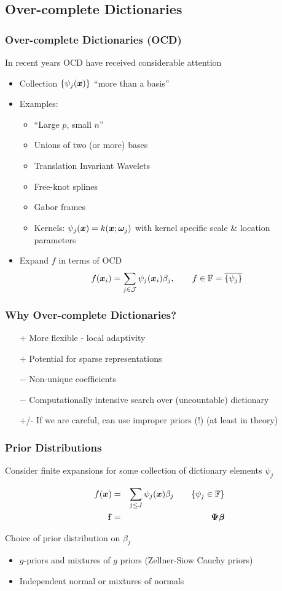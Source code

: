 \documentclass[dvips]{beamer}
\newcommand{\bs}[2]{\begin{frame} \frametitle{#1} 
{#2}
\end{frame} }
\begin{document}
\subsection{Over-complete Dictionaries }

\bs{Over-complete Dictionaries (OCD)} {
In recent years OCD have received considerable attention
\begin{itemize}
\item  Collection $\{\psi_{j}(\bm x) \}$  ``more than a basis''
  \item Examples:
    \begin{itemize}
    \item ``Large $p$, small $n$''
    \item Unions of two (or more) bases
    \item Translation Invariant Wavelets
    \item Free-knot splines
    \item Gabor frames
   \item Kernels:  $\psi_j(\bm x) = k(\bm x; \bm \omega_j)$ with kernel
   specific scale \& location parameters 
   \end{itemize}
\item   Expand $f$ in terms of OCD  
   \[ f(\bm x_i) = \sum_{j \in \mathcal{J} } \psi_j(\bm x_i)\beta_j,\qquad f \in
   \mathbb{F}=\overline{\{\psi_{j}\}}\]
  \end{itemize} 
}


\bs{Why Over-complete Dictionaries?} {
  \begin{itemize}
  \item[$+$] More flexible - local adaptivity
  \item[$+$] Potential for sparse representations
  \item[]
  \item[$-$] Non-unique coefficients
  \item[$-$] Computationally intensive search over (uncountable)
    dictionary 
\item[]
\item[+/-] If we are careful, can use improper
  priors (!)  (at least in theory)
\end{itemize}
}

\bs{Prior Distributions} {

Consider finite expansions for some collection of dictionary elements $\psi_j$

\begin{eqnarray*}
f(\bm x) &  = &  \sum_{j\le J}\psi_j(\bm x) \beta_j  \quad \quad  \{ \psi_j \in \mathbb{F} \} \\
 \bf{f}  & = & \bm \Psi \bm \beta 
\end{eqnarray*}

Choice of prior distribution on $\beta_j$

\begin{itemize}
\item  $g$-priors and mixtures of $g$ priors (Zellner-Siow Cauchy priors)
\item  Independent normal or mixtures of normals 
\end{itemize}
}
\end{document}
